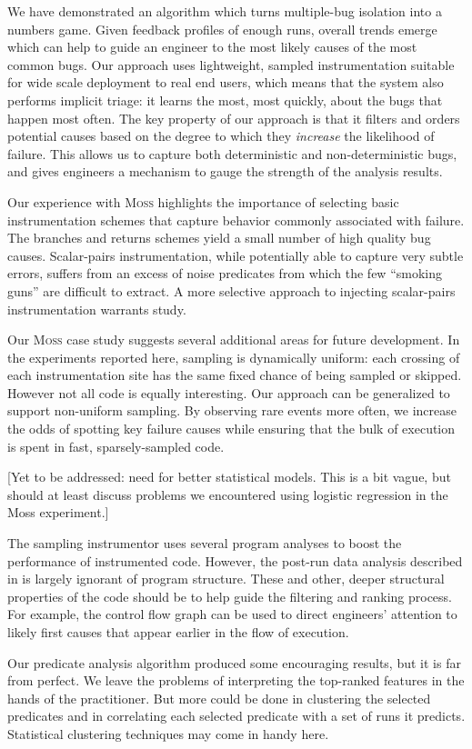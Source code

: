 \documentclass{sig-alternate}
\newcommand{\moss}{\textsc{Moss}\xspace}
\newcommand{\placeholder}[1]{{\color[cmyk]{0,0.61,0.87,0}[#1]}}
\begin{document}
We have demonstrated an algorithm which turns multiple-bug isolation
into a numbers game.  Given feedback profiles of enough runs, overall
trends emerge which can help to guide an engineer to the most likely
causes of the most common bugs.  Our approach uses lightweight,
sampled instrumentation suitable for wide scale deployment to real end
users, which means that the system also performs implicit triage: it
learns the most, most quickly, about the bugs that happen most often.
The key property of our approach is that it filters and orders
potential causes based on the degree to which they \emph{increase} the
likelihood of failure.  This allows us to capture both deterministic
and non-deterministic bugs, and gives engineers a mechanism to gauge
the strength of the analysis results.

Our experience with \moss highlights the importance of selecting basic
instrumentation schemes that capture behavior commonly associated with
failure.  The branches and returns schemes yield a small number of
high quality bug causes.  Scalar-pairs instrumentation, while
potentially able to capture very subtle errors, suffers from an excess
of noise predicates from which the few ``smoking guns'' are difficult
to extract.  A more selective approach to injecting scalar-pairs
instrumentation warrants study.

Our \moss case study suggests several additional areas for future
development.  In the experiments reported here, sampling is
dynamically uniform: each crossing of each instrumentation site has
the same fixed chance of being sampled or skipped.  However not all
code is equally interesting.  Our approach can be generalized to
support non-uniform sampling.  By observing rare events more often, we
increase the odds of spotting key failure causes while ensuring that
the bulk of execution is spent in fast, sparsely-sampled code.

\placeholder{Yet to be addressed: need for better statistical models.
  This is a bit vague, but should at least discuss problems we
  encountered using logistic regression in the Moss experiment.}

The sampling instrumentor uses several program analyses to boost the
performance of instrumented code.  However, the post-run data analysis
described in  is largely ignorant of program
structure.  These and other, deeper structural properties of the code
should be to help guide the filtering and ranking process.  For
example, the control flow graph can be used to direct engineers'
attention to likely first causes that appear earlier in the flow of
execution.

Our predicate analysis algorithm produced some encouraging results,
but it is far from perfect.  We leave the problems of interpreting the
top-ranked features in the hands of the practitioner.  But more could
be done in clustering the selected predicates and in correlating each
selected predicate with a set of runs it predicts.  Statistical
clustering techniques may come in handy here.


\end{document}
